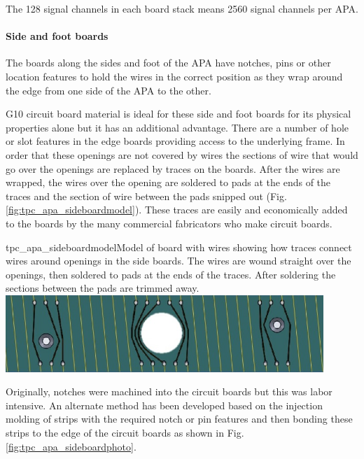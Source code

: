 The 128 signal channels in each board stack means 2560 signal channels per APA.

\paragraph{Side and foot boards}

The boards along the sides and foot of the APA have notches, pins or other location features to hold the wires in the correct position as they wrap around the edge from one side of the APA to the other.

G10 circuit board material is ideal for these side and foot boards for its physical properties alone but it has an additional advantage.  There are a number of hole or slot features in the edge boards providing access to the underlying frame.  In order that these openings are not covered by wires the sections of wire that would go over the openings are replaced by traces on the boards.  After the wires are wrapped, the wires over the opening are soldered to pads at the ends of the traces and the section of wire between the pads snipped out (Fig. \ref{fig:tpc_apa_sideboardmodel}).  These traces are easily and economically added to the boards by the many commercial fabricators who make circuit boards.

\begin{cdrfigure}{tpc_apa_sideboardmodel}{Model of board with wires showing how traces connect wires around openings in the side boards.  The wires are wound straight over the openings, then soldered to pads at the ends of the traces.  After soldering the sections between the pads are trimmed away.}
\includegraphics[width=0.9\textwidth]{figures/tpc_apa_sideboardmodel.png} 
\end{cdrfigure}

Originally, notches were machined into the circuit boards but this was labor intensive.  An alternate method has been developed based on the injection molding of strips with the required notch or pin features and then bonding these strips to the edge of the circuit boards as shown in Fig. \ref{fig:tpc_apa_sideboardphoto}.

